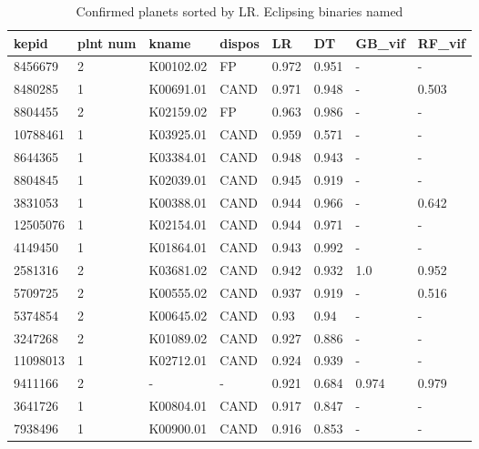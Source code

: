 \begin{table}[!htbp]
 \centering
 \caption{Confirmed planets sorted by LR. Eclipsing binaries named}
 \label{dataLRDTGBvifRFviftab} 
  \begin{tabular}
{| 
 p{}| 
 p{}| 
 p{}| 
 p{}| 
 p{}| 
 p{}| 
 p{}| 
 p{}| 
}\hline 
\textbf{kepid} &\textbf{plnt num} &\textbf{kname} &\textbf{dispos} &\textbf{LR} &\textbf{DT} &\textbf{GB\_vif} &\textbf{RF\_vif} \\ \hline 
8456679 &2 &K00102.02 &FP &0.972 &0.951 &- &- \\ \hline 
8480285 &1 &K00691.01 &CAND &0.971 &0.948 &- &0.503 \\ \hline 
8804455 &2 &K02159.02 &FP &0.963 &0.986 &- &- \\ \hline 
10788461 &1 &K03925.01 &CAND &0.959 &0.571 &- &- \\ \hline 
8644365 &1 &K03384.01 &CAND &0.948 &0.943 &- &- \\ \hline 
8804845 &1 &K02039.01 &CAND &0.945 &0.919 &- &- \\ \hline 
3831053 &1 &K00388.01 &CAND &0.944 &0.966 &- &0.642 \\ \hline 
12505076 &1 &K02154.01 &CAND &0.944 &0.971 &- &- \\ \hline 
4149450 &1 &K01864.01 &CAND &0.943 &0.992 &- &- \\ \hline 
2581316 &2 &K03681.02 &CAND &0.942 &0.932 &1.0 &0.952 \\ \hline 
5709725 &2 &K00555.02 &CAND &0.937 &0.919 &- &0.516 \\ \hline 
5374854 &2 &K00645.02 &CAND &0.93 &0.94 &- &- \\ \hline 
3247268 &2 &K01089.02 &CAND &0.927 &0.886 &- &- \\ \hline 
11098013 &1 &K02712.01 &CAND &0.924 &0.939 &- &- \\ \hline 
9411166 &2 &- &- &0.921 &0.684 &0.974 &0.979 \\ \hline 
3641726 &1 &K00804.01 &CAND &0.917 &0.847 &- &- \\ \hline 
7938496 &1 &K00900.01 &CAND &0.916 &0.853 &- &- \\ \hline 

\end{tabular}
\end{table}
